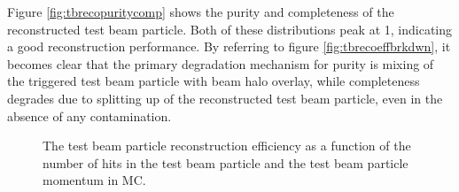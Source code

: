 Figure \ref{fig:tbrecopuritycomp} shows the purity and completeness of the reconstructed test beam particle.  Both of these distributions peak at 1, indicating a good reconstruction performance. By referring to figure \ref{fig:tbrecoeffbrkdwn}, it becomes clear that the primary degradation mechanism for purity is mixing of the triggered test beam particle with beam halo overlay, while completeness degrades due to splitting up of the reconstructed test beam particle, even in the absence of any contamination.  

\begin{figure}
\centering
{}
\caption{The test beam particle reconstruction efficiency as a function of \protect{} the number of hits in the test beam particle and \protect{} the test beam particle momentum in MC.}
\label{fig:tbrecoeff}
\end{figure}

